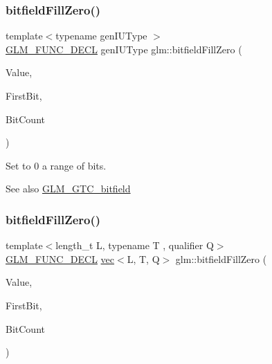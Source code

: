 \subsubsection{\texorpdfstring{bitfield\+Fill\+Zero()}{bitfieldFillZero()}\hspace{0.1cm}{\footnotesize\ttfamily [1/2]}}
{\footnotesize\ttfamily template$<$typename gen\+I\+U\+Type $>$ \\
\mbox{\hyperlink{setup_8hpp_ab2d052de21a70539923e9bcbf6e83a51}{G\+L\+M\+\_\+\+F\+U\+N\+C\+\_\+\+D\+E\+CL}} gen\+I\+U\+Type glm\+::bitfield\+Fill\+Zero (\begin{DoxyParamCaption}\item[{gen\+I\+U\+Type}]{Value,  }\item[{int}]{First\+Bit,  }\item[{int}]{Bit\+Count }\end{DoxyParamCaption})}

Set to 0 a range of bits.

\begin{DoxySeeAlso}{See also}
\mbox{\hyperlink{group__gtc__bitfield}{G\+L\+M\+\_\+\+G\+T\+C\+\_\+bitfield}} 
\end{DoxySeeAlso}
\mbox{\label{group__gtc__bitfield_ga0d16c9acef4be79ea9b47c082a0cf7c2}} 
\subsubsection{\texorpdfstring{bitfield\+Fill\+Zero()}{bitfieldFillZero()}\hspace{0.1cm}{\footnotesize\ttfamily [2/2]}}
{\footnotesize\ttfamily template$<$length\+\_\+t L, typename T , qualifier Q$>$ \\
\mbox{\hyperlink{setup_8hpp_ab2d052de21a70539923e9bcbf6e83a51}{G\+L\+M\+\_\+\+F\+U\+N\+C\+\_\+\+D\+E\+CL}} \mbox{\hyperlink{structglm_1_1vec}{vec}}$<$L, T, Q$>$ glm\+::bitfield\+Fill\+Zero (\begin{DoxyParamCaption}\item[{\mbox{\hyperlink{structglm_1_1vec}{vec}}$<$ L, T, Q $>$ const \&}]{Value,  }\item[{int}]{First\+Bit,  }\item[{int}]{Bit\+Count }\end{DoxyParamCaption})}

